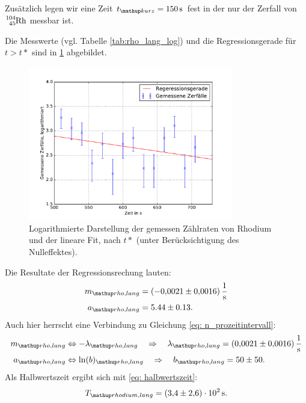 Zusätzlich legen wir eine Zeit $t\ua{kurz}=\SI{150}{\second}$ fest in der
nur der Zerfall von $\ce{^{104}_{45} Rh}$ messbar ist.

Die Messwerte (vgl. Tabelle \ref{tab:rho_lang_log}) und die Regressionsgerade für $t>t*$ sind in \ref{fig: plot_rhodium_lang} abgebildet.
\begin{figure}
  \centering
  \includegraphics[width=0.8\textwidth]{pics/rhodium_lang_miterror.pdf}
  \caption{Logarithmierte Darstellung der gemessen Zählraten von Rhodium und der lineare Fit, nach $t*$  (unter Berücksichtigung des Nulleffektes).} %
  \label{fig: plot_rhodium_lang}
\end{figure}
Die Resultate der Regressionsrechung lauten:
\begin{align}
  \label{eq:parameter_rhodium_lang}
  \begin{aligned}
    m\ua{rho,lang}&=\SI{-0.0021\pm0.0016}{\per\second}\\
    a\ua{rho,lang}&=5.44\pm0.13.
  \end{aligned}
\end{align}
Auch hier herrscht eine Verbindung zu Gleichung \eqref{eq: n_prozeitintervall}:
\begin{align}
  \label{eq:parameter_rhodium_lang_lambda}
  \begin{aligned}
    m\ua{rho,lang}&\Leftrightarrow -\lambda\ua{rho,lang} \quad \Rightarrow \quad \lambda\ua{rho,lang}=\SI{0.0021\pm0.0016}{\per\second}\\
    a\ua{rho,lang}&\Leftrightarrow \ln(b)\ua{rho,lang} \quad \Rightarrow \quad b\ua{rho,lang} =50\pm 50.
  \end{aligned}
\end{align}
Als Halbwertszeit ergibt sich mit \eqref{eq: halbwertszeit}:
\begin{equation}
  \label{eq:halbwertzeit_rhodium}
  T\ua{rhodium, lang}=\SI{3.4\pm2.6 e+2}{\second}.
\end{equation}
